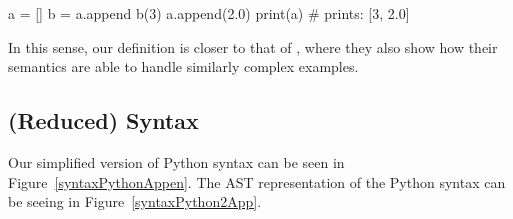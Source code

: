 \begin{pythoncode}
a = []
b = a.append
b(3)
a.append(2.0)
print(a)  # prints: [3, 2.0]
\end{pythoncode}

In this sense, our definition is closer to that of \textcite{politz_python_2013}, where
they also show how their semantics are able to handle similarly complex examples.

\subsection{(Reduced) Syntax}\label{reduced-syntax}

Our simplified version of Python syntax can be seen in Figure~\ref{syntaxPythonAppen}.
The AST representation of the Python syntax can be seeing in Figure~\ref{syntaxPython2App}.


